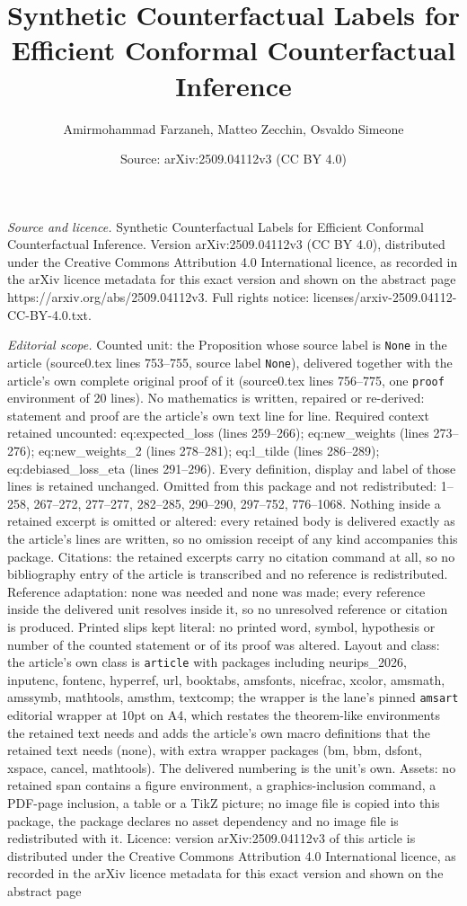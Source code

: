\documentclass[10pt,a4paper]{amsart}
\title[Synthetic Counterfactual Labels for Efficient Conformal Coun]{Synthetic Counterfactual Labels for Efficient Conformal Counterfactual Inference}
\author{Amirmohammad Farzaneh, Matteo Zecchin, Osvaldo Simeone}
\date{Source: arXiv:2509.04112v3 (CC BY 4.0)}
\begin{document}
\maketitle

\noindent\emph{Source and licence.} Synthetic Counterfactual Labels for Efficient Conformal Counterfactual Inference. Version arXiv:2509.04112v3 (CC BY 4.0), distributed under the Creative Commons Attribution 4.0 International licence, as recorded in the arXiv licence metadata for this exact version and shown on the abstract page https://arxiv.org/abs/2509.04112v3. Full rights notice: licenses/arxiv-2509.04112-CC-BY-4.0.txt.\par\smallskip

\noindent\textit{Editorial scope.} Counted unit: the Proposition whose source label is \texttt{None} in the article (source0.tex lines 753--755, source label \texttt{None}), delivered together with the article's own complete original proof of it (source0.tex lines 756--775, one \texttt{proof} environment of 20 lines). No mathematics is written, repaired or re-derived: statement and proof are the article's own text line for line. Required context retained uncounted: eq:expected\_loss (lines 259--266); eq:new\_weights (lines 273--276); eq:new\_weights\_2 (lines 278--281); eq:l\_tilde (lines 286--289); eq:debiased\_loss\_eta (lines 291--296). Every definition, display and label of those lines is retained unchanged. Omitted from this package and not redistributed: 1--258, 267--272, 277--277, 282--285, 290--290, 297--752, 776--1068. Nothing inside a retained excerpt is omitted or altered: every retained body is delivered exactly as the article's lines are written, so no omission receipt of any kind accompanies this package. Citations: the retained excerpts carry no citation command at all, so no bibliography entry of the article is transcribed and no reference is redistributed. Reference adaptation: none was needed and none was made; every reference inside the delivered unit resolves inside it, so no unresolved reference or citation is produced. Printed slips kept literal: no printed word, symbol, hypothesis or number of the counted statement or of its proof was altered. Layout and class: the article's own class is \texttt{article} with packages including neurips\_2026, inputenc, fontenc, hyperref, url, booktabs, amsfonts, nicefrac, xcolor, amsmath, amssymb, mathtools, amsthm, textcomp; the wrapper is the lane's pinned \texttt{amsart} editorial wrapper at 10pt on A4, which restates the theorem-like environments the retained text needs and adds the article's own macro definitions that the retained text needs (none), with extra wrapper packages (bm, bbm, dsfont, xspace, cancel, mathtools). The delivered numbering is the unit's own. Assets: no retained span contains a figure environment, a graphics-inclusion command, a PDF-page inclusion, a table or a TikZ picture; no image file is copied into this package, the package declares no asset dependency and no image file is redistributed with it. Licence: version arXiv:2509.04112v3 of this article is distributed under the Creative Commons Attribution 4.0 International licence, as recorded in the arXiv licence metadata for this exact version and shown on the abstract page 
\end{document}

